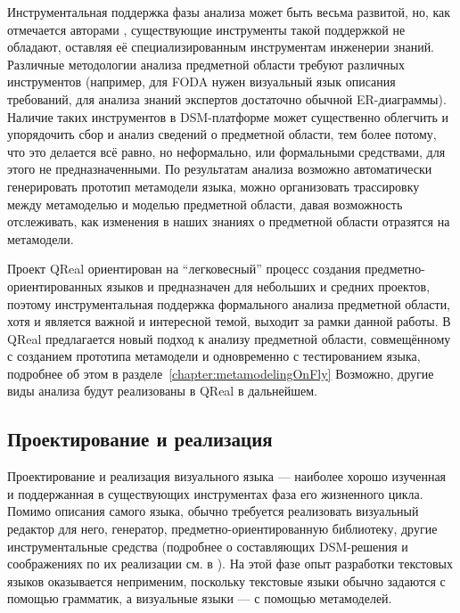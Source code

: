 Инструментальная поддержка фазы анализа может быть весьма развитой, но, как отмечается 
авторами \cite{mernik2005and}, существующие инструменты такой поддержкой не обладают, 
оставляя её специализированным инструментам инженерии знаний. Различные методологии 
анализа предметной области требуют различных инструментов (например, для FODA нужен 
визуальный язык описания требований, для анализа знаний экспертов достаточно обычной 
ER-диаграммы). Наличие таких инструментов в DSM-платформе может существенно облегчить 
и упорядочить сбор и анализ сведений о предметной области, тем более потому, что это 
делается всё равно, но неформально, или формальными средствами, для этого не предназначенными. 
По результатам анализа возможно автоматически генерировать прототип метамодели языка, 
можно организовать трассировку между метамоделью и моделью предметной области, давая 
возможность отслеживать, как изменения в наших знаниях о предметной области отразятся на метамодели.

Проект QReal ориентирован на "`легковесный"' процесс создания предметно-ориентированных 
языков и предназначен для небольших и средних проектов, поэтому инструментальная поддержка 
формального анализа предметной области, хотя и является важной и интересной темой, 
выходит за рамки данной работы. В QReal предлагается новый подход к анализу предметной 
области, совмещённому с созданием прототипа метамодели и одновременно с тестированием языка, 
подробнее об этом в разделе~\ref{chapter:metamodelingOnFly} Возможно, другие виды анализа будут реализованы 
в QReal в дальнейшем.

\subsection{Проектирование и реализация}
Проектирование и реализация визуального языка --- наиболее хорошо изученная и поддержанная 
в существующих инструментах фаза его жизненного цикла. Помимо описания самого языка, 
обычно требуется реализовать визуальный редактор для него, генератор, предметно-ориентированную 
библиотеку, другие инструментальные средства (подробнее о составляющих DSM-решения и 
соображениях по их реализации см. в \cite{kelly2008domain}). На этой фазе опыт разработки 
текстовых языков оказывается неприменим, поскольку текстовые языки обычно задаются с 
помощью грамматик, а визуальные языки --- с помощью метамоделей.

